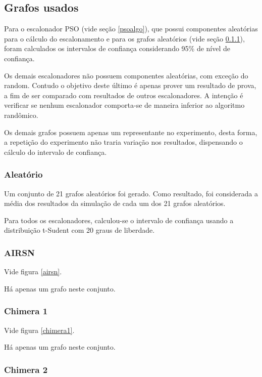 \documentclass[a4paper,10pt]{article}
\begin{document}
\subsection{Grafos usados}
\label{grafosusados}

Para o escalonador PSO (vide seção \ref{psoalgo}), que possui componentes aleatórias para o cálculo do escalonamento e
para os grafos aleatórios (vide seção \ref{grafaleatorio}), foram calculados os intervalos de confiança considerando 
95\% de nível de confiança.

Os demais escalonadores não possuem componentes aleatórias, com exceção do random. Contudo o objetivo deste último
é apenas prover um resultado de prova, a fim de ser comparado com resultados de outros escalonadores. A intenção é
verificar se nenhum escalonador comporta-se de maneira inferior ao algoritmo randômico.

Os demais grafos possuem apenas um representante no experimento, desta forma, a repetição do experimento não traria
variação nos resultados, dispensando o cálculo do intervalo de confiança.

\subsubsection{Aleatório}
\label{grafaleatorio}

Um conjunto de 21 grafos aleatórios foi gerado. Como resultado, foi considerada a média dos resultados
da simulação de cada um dos 21 grafos aleatórios.

Para todos os escalonadores, calculou-se o intervalo de confiança usando a distribuição t-Sudent com
20 graus de liberdade.

\subsubsection{AIRSN}

Vide figura \ref{airsn}.

Há apenas um grafo neste conjunto.

\subsubsection{Chimera 1}

Vide figura \ref{chimera1}.

Há apenas um grafo neste conjunto.

\subsubsection{Chimera 2}
\end{document}
